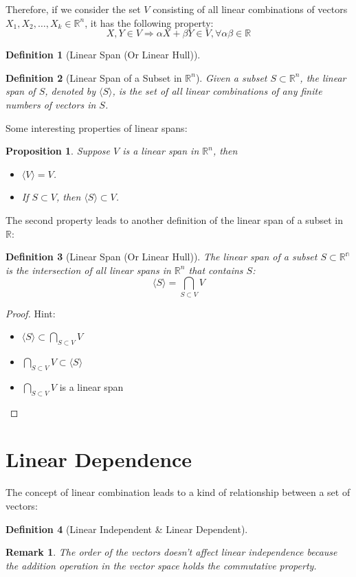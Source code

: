 \documentclass[onecolumn]{ctexart}
\newtheorem{definition}{Definition}
\newtheorem{proposition}{Proposition}
\newtheorem{remark}{Remark}
\begin{document}
Therefore, if we consider the set $V$ consisting of all linear combinations of 
vectors $X_1, X_2, \ldots, X_k \in \mathbb{R}^n$, it has the following property:
\[
  X, Y \in V \Rightarrow \alpha X + \beta Y \in V, \forall \alpha \beta \in \mathbb{R}
\]

\begin{definition}[Linear Span (Or Linear Hull)]
  
\end{definition}

\begin{definition}[Linear Span of a Subset in $\mathbb{R}^n$]
  Given a subset $S \subset \mathbb{R}^n$, the linear span of $S$, denoted by 
  $\langle S \rangle$, is the set of all linear combinations of any finite numbers of vectors 
  in $S$.
\end{definition}
Some interesting properties of linear spans:
\begin{proposition}
  Suppose $V$ is a linear span in $\mathbb{R}^n$, then
  \begin{itemize}
    \item $\langle V \rangle = V$.
    \item If $S \subset V$, then $\langle S \rangle \subset V$.
  \end{itemize}
\end{proposition}
The second property leads to another definition of the linear span of a subset in $\mathbb{R}$:
\begin{definition}[Linear Span (Or Linear Hull)]
  The linear span of a subset $S \subset \mathbb{R^n}$ is the intersection of 
  all linear spans in $\mathbb{R}^n$ that contains $S$:
  \[
    \langle S \rangle = \bigcap_{S \subset V} V
  \]
\end{definition}
\begin{proof}
  Hint:
  \begin{itemize}
    \item $\langle S \rangle \subset \bigcap_{S \subset V} V$
    \item $\bigcap_{S \subset V} V \subset \langle S \rangle$
    \item $\bigcap_{S \subset V} V$ is a linear span
  \end{itemize}
\end{proof}

\section{Linear Dependence}
The concept of linear combination leads to a kind of relationship between a set 
of vectors:
\begin{definition}[Linear Independent \& Linear Dependent]

\end{definition}
\begin{remark}
  The order of the vectors doesn't affect linear independence because the 
  addition operation in the vector space holds the commutative property.
\end{remark}
\end{document}
